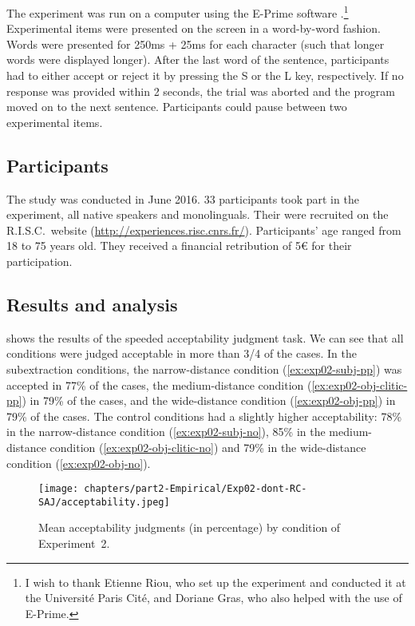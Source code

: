 The experiment was run on a computer using the E-Prime software \citep{Eprime}.\footnote{I wish to thank Etienne Riou, who set up the experiment and conducted it at the Université Paris Cité, and Doriane Gras, who also helped with the use of E-Prime.} Experimental items were presented on the screen in a word-by-word fashion. Words were presented for 250ms + 25ms for each character (such that longer words were displayed longer). After the last word of the sentence, participants had to either accept or reject it by pressing the S or the L key, respectively. If no response was provided within 2 seconds, the trial was aborted and the program moved on to the next sentence. Participants could pause between two experimental items.

\subsection{Participants}

The study was conducted in June 2016.  33 participants took part in the experiment, all native speakers and monolinguals. Their were recruited on the R.I.S.C.\ website (\url{http://experiences.risc.cnrs.fr/}). Participants' age ranged from 18 to 75 years old. They received a financial retribution of 5€ for their participation.

\subsection{Results and analysis}

 shows the results of the speeded acceptability judgment task. We can see that all conditions were judged acceptable in more than 3/4 of the cases. In the subextraction conditions, the narrow-distance condition (\ref{ex:exp02-subj-pp}) was accepted in 77\% of the cases, the medium-distance condition (\ref{ex:exp02-obj-clitic-pp}) in 79\% of the cases, and the wide-distance condition (\ref{ex:exp02-obj-pp}) in 79\% of the cases. The control conditions had a slightly higher acceptability: 78\% in the narrow-distance condition (\ref{ex:exp02-subj-no}), 85\% in the medium-distance condition (\ref{ex:exp02-obj-clitic-no}) and 79\% in the wide-distance condition (\ref{ex:exp02-obj-no}). 

\begin{figure}
    \centering
    \texttt{[image: chapters/part2-Empirical/Exp02-dont-RC-SAJ/acceptability.jpeg]}
    \caption{Mean acceptability judgments (in percentage) by condition of Experiment~2.}
    \label{fig:exp02-boxplot}
\end{figure}

